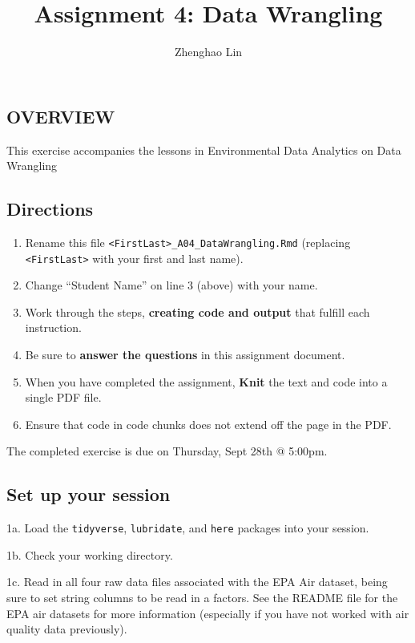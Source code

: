 \documentclass[
]{article}
\title{Assignment 4: Data Wrangling}
\author{Zhenghao Lin}
\date{}
\providecommand{\tightlist}{%
  \setlength{\itemsep}{0pt}\setlength{\parskip}{0pt}}
\begin{document}
\maketitle

\hypertarget{overview}{%
\subsection{OVERVIEW}\label{overview}}

This exercise accompanies the lessons in Environmental Data Analytics on
Data Wrangling

\hypertarget{directions}{%
\subsection{Directions}\label{directions}}

\begin{enumerate}
\def\labelenumi{\arabic{enumi}.}
\tightlist
\item
  Rename this file
  \texttt{\textless{}FirstLast\textgreater{}\_A04\_DataWrangling.Rmd}
  (replacing \texttt{\textless{}FirstLast\textgreater{}} with your first
  and last name).
\item
  Change ``Student Name'' on line 3 (above) with your name.
\item
  Work through the steps, \textbf{creating code and output} that fulfill
  each instruction.
\item
  Be sure to \textbf{answer the questions} in this assignment document.
\item
  When you have completed the assignment, \textbf{Knit} the text and
  code into a single PDF file.
\item
  Ensure that code in code chunks does not extend off the page in the
  PDF.
\end{enumerate}

The completed exercise is due on Thursday, Sept 28th @ 5:00pm.

\hypertarget{set-up-your-session}{%
\subsection{Set up your session}\label{set-up-your-session}}

1a. Load the \texttt{tidyverse}, \texttt{lubridate}, and \texttt{here}
packages into your session.

1b. Check your working directory.

1c. Read in all four raw data files associated with the EPA Air dataset,
being sure to set string columns to be read in a factors. See the README
file for the EPA air datasets for more information (especially if you
have not worked with air quality data previously).
\end{document}
